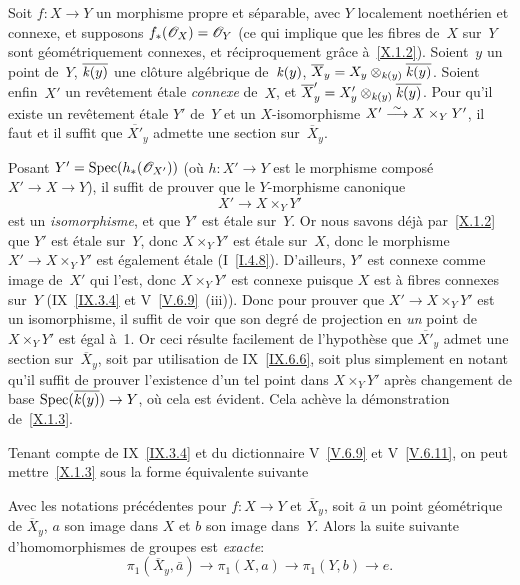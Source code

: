 \begin{theoreme}
\label{X.1.3}
Soit $f\colon X\to Y$ un morphisme propre et s\'eparable, avec $Y$
localement noeth\'erien et connexe, et supposons
$f_*(\cal{O}_X)=\cal{O}_Y$ (ce qui implique que les fibres de~$X$ sur~$Y$ sont g\'eom\'etriquement connexes, et r\'eciproquement
gr\^ace \`a~\ref{X.1.2}). Soient~$y$ un point de~$Y$,
$\overline{\mathit{k}(y)}$ une cl\^oture alg\'ebrique de~$\mathit{k}(y)$,
$\overline X_y =X_y\otimes_{\mathit{k}(y)} \overline{\mathit{k}(y)}$. Soient \hbox{enfin~$X'$} un rev\^etement \'etale \emph{connexe} de~$X$, et $\overline
X_y' =X_y'\otimes_{\mathit{k}(y)} \overline{\mathit{k}(y)}$. Pour qu'il existe un
rev\^etement \'etale $Y'$ de~$Y$ et un $X$-isomorphisme
$X'\overset{\sim}{\longrightarrow} X\times_Y Y'$, il faut et il suffit que $\overline{X'}_y$
admette une section sur~$\overline X_y$.
\end{theoreme}

Posant $Y'=\Spec(h_*(\cal{O}_{X'}))$ (o\`u $h\colon X'\to Y$ est le
morphisme compos\'e $X'\to X\to Y$), il suffit de prouver que le
$Y$-morphisme canonique
$$
X'\to X\times_Y Y'
$$
est un \emph{isomorphisme}, et que $Y'$ est \'etale sur~$Y$. Or nous
savons d\'ej\`a par~\ref{X.1.2} que $Y'$ est \'etale sur~$Y$,
donc $X\times_Y Y'$ est \'etale sur~$X$, donc le morphisme $X'\to
X\times_Y Y'$ est \'egalement \'etale (I~\ref{I.4.8}). D'ailleurs,
$Y'$ est connexe comme image de~$X'$ qui l'est, donc $X\times_Y Y'$
est connexe puisque $X$ est \`a fibres connexes sur~$Y$
(IX~\ref{IX.3.4} et V~\ref{V.6.9}~(iii)). Donc pour prouver que
$X'\to X\times_Y Y'$ est un isomorphisme, il suffit de voir que son
degr\'e de projection en \emph{un} point de~$X\times_Y Y'$ est
\'egal \`a~1. Or ceci r\'esulte facilement de l'hypoth\`ese
que $\overline{X'}_y$ admet une section sur~$\overline X_y$, soit
par utilisation de IX~\ref{IX.6.6}, soit plus simplement en notant qu'il
suffit de prouver l'existence d'un tel point dans $X\times_Y Y'$
apr\`es changement de base
$\Spec(\overline{\kres(y)})\to Y$, o\`u cela
est \'evident. Cela ach\`eve la d\'emonstration de~\ref{X.1.3}.

Tenant compte de IX~\ref{IX.3.4} et du dictionnaire V~\ref{V.6.9} et
V~\ref{V.6.11}, on peut mettre~\ref{X.1.3} sous la forme
\'equivalente suivante

\begin{corollaire}
\label{X.1.4}
Avec les notations pr\'ec\'edentes pour $f\colon X\to Y$ et
$\overline X_y$, soit $\bar{a}$ un point g\'eom\'etrique de
$\overline X_y$, $a$ son image dans $X$ et $b$ son image
dans~$Y$. Alors la suite suivante d'homomorphismes de groupes est
\emph{exacte}:
$$
\pi_1(\overline X_y,\bar{a})\to \pi_1(X,a)\to \pi_1(Y,b)\to e.
$$
\end{corollaire}

